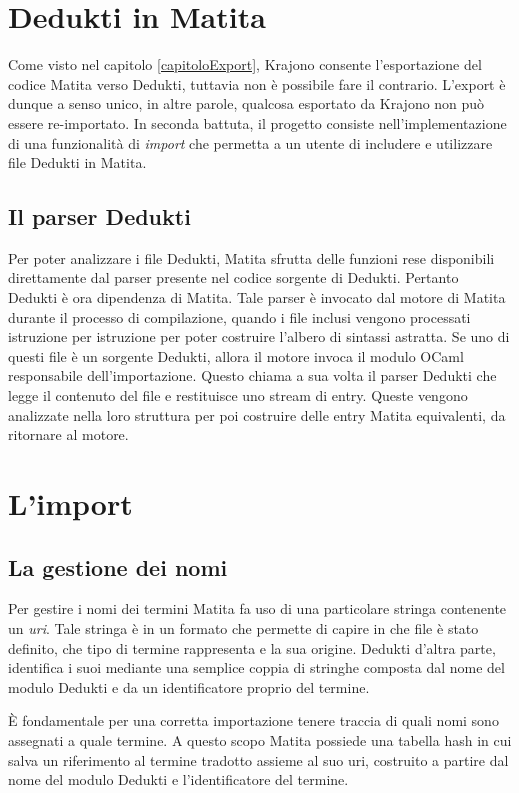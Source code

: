\documentclass[12pt,a4paper]{mimosis}
\begin{document}
\section{Dedukti in Matita}
Come visto nel capitolo \ref{capitoloExport}, Krajono consente l'esportazione del codice
Matita verso Dedukti, tuttavia non è possibile fare il contrario. L'export è dunque 
a senso unico, in altre parole, qualcosa esportato da Krajono non può essere re-importato. In seconda
battuta, il progetto consiste nell'implementazione di una funzionalità di \textit{import}
che permetta a un utente di includere e utilizzare file Dedukti in Matita.

\subsection{Il parser Dedukti}\label{sottosezioneParserDedukti}
Per poter analizzare i file Dedukti, Matita sfrutta delle funzioni rese disponibili
direttamente dal parser presente nel codice sorgente di Dedukti. Pertanto Dedukti è
ora dipendenza di Matita. Tale parser è invocato dal motore di Matita durante il processo
di compilazione, quando i file inclusi vengono processati istruzione per istruzione 
per poter costruire l'albero di sintassi astratta. Se uno di questi file è un sorgente
Dedukti, allora il motore invoca il modulo OCaml responsabile dell'importazione. 
Questo chiama a sua volta il parser Dedukti che legge il contenuto del file e restituisce
uno stream di entry. Queste vengono analizzate nella loro struttura per poi costruire delle
entry Matita equivalenti, da ritornare al motore.

\section{L'import}

\subsection{La gestione dei nomi}
Per gestire i nomi dei termini Matita fa uso di una particolare stringa contenente un 
\textit{uri}. Tale stringa è in un formato che permette di capire in che file è stato
definito, che tipo di termine rappresenta e la sua origine. Dedukti d'altra parte, identifica
i suoi mediante una semplice coppia di stringhe composta dal nome del modulo Dedukti
e da un identificatore proprio del termine. 

È fondamentale per una corretta importazione tenere traccia di quali nomi sono
assegnati a quale termine. A questo scopo Matita possiede una tabella hash in cui salva
un riferimento al termine tradotto assieme al suo uri, costruito a partire dal nome
del modulo Dedukti e l'identificatore del termine.
\end{document}
